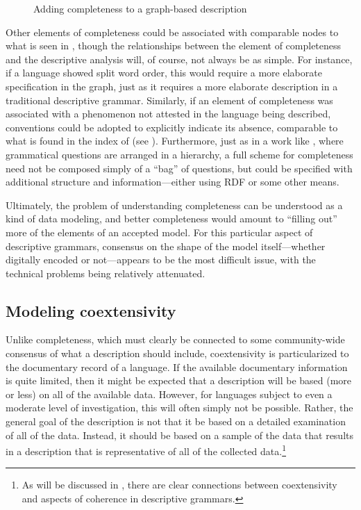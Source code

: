 \begin{figure}[ht]
\centering
{}
\caption{Adding completeness to a graph-based description \label{MergeIndex}}
\end{figure}

Other elements of completeness could be associated with comparable nodes to what
is seen in , though the relationships between the element of
completeness and the descriptive analysis will, of course, not always be as
simple. For instance, if a language showed split word order, this would require
a more elaborate specification in the graph, just as it requires a more
elaborate description in a traditional descriptive grammar. Similarly, if an
element of completeness was associated with a phenomenon not attested in the
language being described, conventions could be adopted to explicitly indicate
its absence, comparable to what is found in the index of
 (see
). Furthermore, just as in a work like
, where grammatical questions are arranged in a
hierarchy, a full scheme for completeness need not be composed simply of a
``bag'' of questions, but could be specified with additional structure and
information---either using RDF or some other means.

Ultimately, the problem of understanding completeness can be understood as a
kind of data modeling, and better completeness would amount to ``filling out''
more of the elements of an accepted model. For this particular aspect of
descriptive grammars, consensus on the shape of the model itself---whether
digitally encoded or not---appears to be the most difficult issue, with the
technical problems being relatively attenuated.



\subsection{Modeling coextensivity\label{ModelingInternal}}

Unlike completeness, which must clearly be connected to some community-wide
consensus of what a description should include, coextensivity is
particularized to the documentary record of a language. If the available
documentary information is quite limited, then it might be expected that a
description will be based (more or less) on all of the available data. However,
for languages subject to even a moderate level of investigation, this will often
simply not be possible. Rather, the general goal of the description is not that
it be based on a detailed examination of all of the data. Instead, it
should be based on a sample of the data that results in a description that is
representative of all of the collected data.{\footnote{As will be discussed in
, there are clear connections between coextensivity and
aspects of coherence in descriptive grammars.}}

